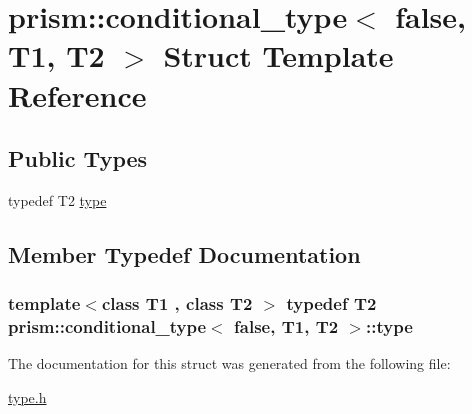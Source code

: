\hypertarget{structprism_1_1conditional__type_3_01false_00_01_t1_00_01_t2_01_4}{}\section{prism\+:\+:conditional\+\_\+type$<$ false, T1, T2 $>$ Struct Template Reference}
\label{structprism_1_1conditional__type_3_01false_00_01_t1_00_01_t2_01_4}
\subsection*{Public Types}
\begin{DoxyCompactItemize}
\item 
typedef T2 \hyperlink{structprism_1_1conditional__type_3_01false_00_01_t1_00_01_t2_01_4_adaf651fbc69931e2ee47b6def8b508a5}{type}
\end{DoxyCompactItemize}


\subsection{Member Typedef Documentation}
\subsubsection[{\texorpdfstring{type}{type}}]{\setlength{\rightskip}{0pt plus 5cm}template$<$class T1 , class T2 $>$ typedef T2 {\bf prism\+::conditional\+\_\+type}$<$ false, T1, T2 $>$\+::{\bf type}}\hypertarget{structprism_1_1conditional__type_3_01false_00_01_t1_00_01_t2_01_4_adaf651fbc69931e2ee47b6def8b508a5}{}\label{structprism_1_1conditional__type_3_01false_00_01_t1_00_01_t2_01_4_adaf651fbc69931e2ee47b6def8b508a5}


The documentation for this struct was generated from the following file\+:\begin{DoxyCompactItemize}
\item 
\hyperlink{type_8h}{type.\+h}\end{DoxyCompactItemize}
